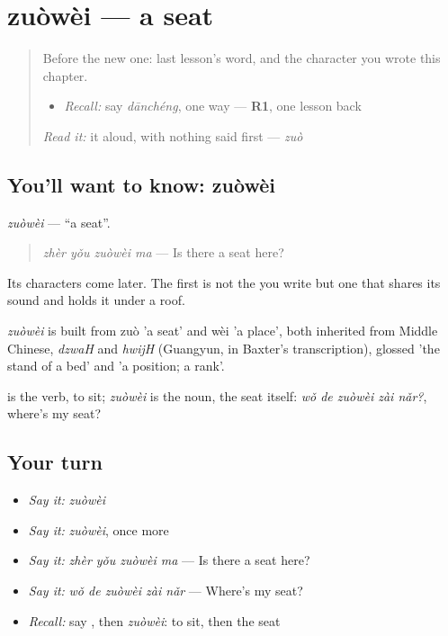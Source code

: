\section[zuòwèi]{zuòwèi — a seat}

\label{lesson:ZH-C284-zuowei}



\begin{quote}
Before the new one: last lesson's word, and the character you wrote this chapter.

\begin{itemize}
\raggedright
  \item \emph{Recall:} say \emph{dānchéng}, one way — \textbf{R1}, one lesson back
\end{itemize}

\begin{quote}
\end{quote}

\emph{Read it:} it aloud, with nothing said first — \emph{zuò}
\end{quote}

\subsection*{You'll want to know: zuòwèi}
\emph{zuòwèi} — \textquotedblleft{}a seat\textquotedblright{}.

\begin{quote}
\emph{zhèr yǒu zuòwèi ma} — Is there a seat here?
\end{quote}

Its characters come later. The first is not the  you write but one that shares its sound and holds it under a roof.

\begin{cousinweb}
\emph{zuòwèi} is built from zuò 'a seat' and wèi 'a place', both inherited from Middle Chinese, \emph{dzwaH} and \emph{hwijH} (Guangyun, in Baxter's transcription), glossed 'the stand of a bed' and 'a position; a rank'.
\end{cousinweb}

\begin{grammarlens}[title={What you've built}]
 is the verb, to sit; \emph{zuòwèi} is the noun, the seat itself: \emph{wǒ de zuòwèi zài nǎr?}, where's my seat?
\end{grammarlens}

\subsection*{Your turn}
\begin{itemize}
\raggedright
  \item \emph{Say it:} \emph{zuòwèi}
  \item \emph{Say it:} \emph{zuòwèi}, once more
  \item \emph{Say it:} \emph{zhèr yǒu zuòwèi ma} — Is there a seat here?
  \item \emph{Say it:} \emph{wǒ de zuòwèi zài nǎr} — Where's my seat?
  \item \emph{Recall:} say , then \emph{zuòwèi}: to sit, then the seat
\end{itemize}

